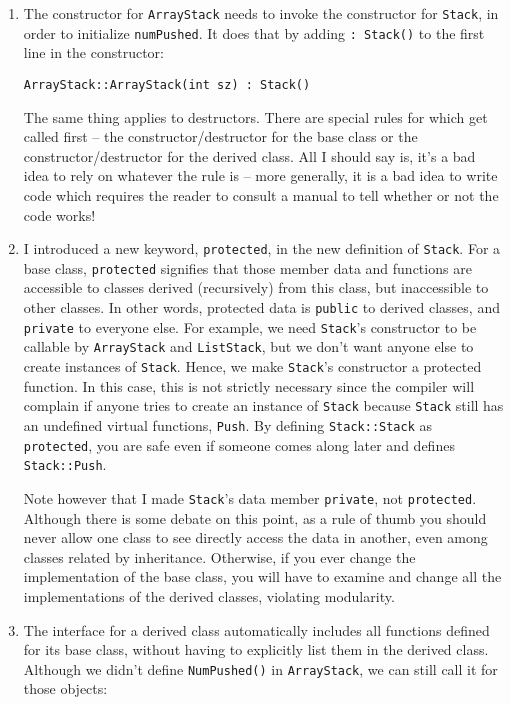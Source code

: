 \begin{enumerate}

\item The constructor for {\tt ArrayStack} needs to invoke the
constructor for {\tt Stack}, in order to initialize {\tt numPushed}.
It does that by adding {\tt : Stack()} to the first line in the constructor:

\begin{verbatim}
ArrayStack::ArrayStack(int sz) : Stack()
\end{verbatim}

The same thing applies to destructors.  There are special rules for which
get called first -- the constructor/destructor for the base class or
the constructor/destructor for the derived class.  All I should say is,
it's a bad idea to rely on whatever the rule is -- more generally, it is a
bad idea to write code which requires the reader to consult a manual
to tell whether or not the code works!

\item I introduced a new keyword, {\tt protected}, in the new definition
of {\tt Stack}.  For a base class, {\tt protected} signifies that those
member data and functions are accessible to classes derived (recursively)
from this class, but inaccessible to other classes.  In other words, protected
data is {\tt public} to derived classes, and {\tt private} to everyone else.
For example, we need {\tt Stack}'s constructor to be callable by
{\tt ArrayStack} and {\tt ListStack}, but we don't want anyone
else to create instances of {\tt Stack}.  Hence, we make {\tt Stack}'s
constructor a protected function.  In this case, this is not strictly
necessary since the compiler will complain if anyone tries to create an
instance of {\tt Stack} because {\tt Stack} still has an undefined virtual
functions, {\tt Push}.  By defining {\tt Stack::Stack} as {\tt protected},
you are safe even if someone comes along later and defines {\tt Stack::Push}.

Note however that I made {\tt Stack}'s data member {\tt private}, not
{\tt protected}.  Although there is some debate on this point,
as a rule of thumb you should never allow one class to see directly
access the data in another, even among classes related
by inheritance.  Otherwise, if you ever change the implementation
of the base class, you will have to examine and change all the
implementations of the derived classes, violating modularity.

\item The interface for a derived class automatically includes all
functions defined for its base class, without having to explicitly
list them in the derived class.  Although we didn't define
{\tt NumPushed()} in {\tt ArrayStack}, we can still call it for
those objects:


\end{enumerate}
